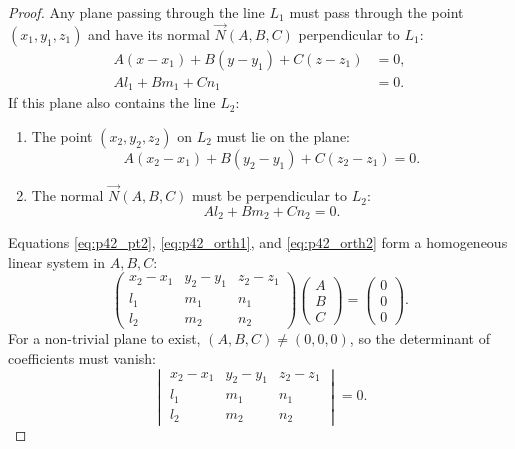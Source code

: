 \begin{proof}
Any plane passing through the line $L_1$ must pass through the point $(x_1, y_1, z_1)$ and have its normal $\vec{N}(A, B, C)$ perpendicular to $L_1$:
\begin{align}
    A(x - x_1) + B(y - y_1) + C(z - z_1) &= 0, \label{eq:p42_plane} \\
    Al_1 + Bm_1 + Cn_1 &= 0. \label{eq:p42_orth1}
\end{align}
If this plane also contains the line $L_2$:
\begin{enumerate}
    \item The point $(x_2, y_2, z_2)$ on $L_2$ must lie on the plane:
    \begin{equation}
        A(x_2 - x_1) + B(y_2 - y_1) + C(z_2 - z_1) = 0. \label{eq:p42_pt2}
    \end{equation}
    \item The normal $\vec{N}(A, B, C)$ must be perpendicular to $L_2$:
    \begin{equation}
        Al_2 + Bm_2 + Cn_2 = 0. \label{eq:p42_orth2}
    \end{equation}
\end{enumerate}
Equations \eqref{eq:p42_pt2}, \eqref{eq:p42_orth1}, and \eqref{eq:p42_orth2} form a homogeneous linear system in $A, B, C$:
\begin{equation}
    \begin{pmatrix}
    x_2 - x_1 & y_2 - y_1 & z_2 - z_1 \\
    l_1 & m_1 & n_1 \\
    l_2 & m_2 & n_2
    \end{pmatrix}
    \begin{pmatrix} A \\ B \\ C \end{pmatrix} = \begin{pmatrix} 0 \\ 0 \\ 0 \end{pmatrix}.
\end{equation}
For a non-trivial plane to exist, $(A, B, C) \neq (0, 0, 0)$, so the determinant of coefficients must vanish:
\begin{equation}
    \begin{vmatrix}
    x_2 - x_1 & y_2 - y_1 & z_2 - z_1 \\
    l_1 & m_1 & n_1 \\
    l_2 & m_2 & n_2
    \end{vmatrix} = 0.
\end{equation}
\end{proof}


